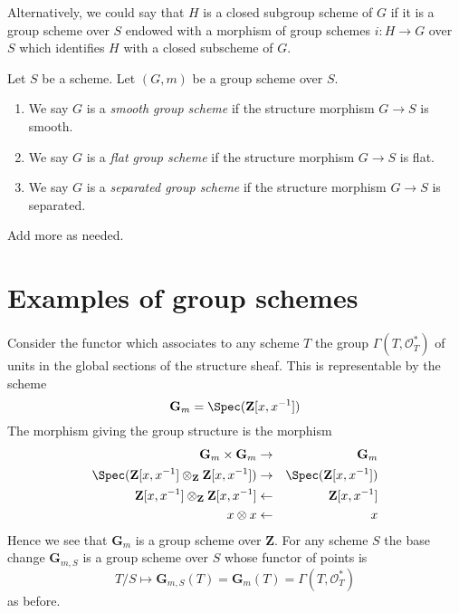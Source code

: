 \noindent
Alternatively, we could say that $H$ is a closed subgroup scheme of $G$
if it is a group scheme over $S$ endowed with a morphism of group schemes
$i : H \to G$ over $S$ which identifies $H$ with a closed subscheme of $G$.

\begin{definition}
\label{definition-smooth-group-scheme}
Let $S$ be a scheme. Let $(G, m)$ be a group scheme over $S$.
\begin{enumerate}
\item We say $G$ is a {\it smooth group scheme} if the structure
morphism $G \to S$ is smooth.
\item We say $G$ is a {\it flat group scheme} if the structure
morphism $G \to S$ is flat.
\item We say $G$ is a {\it separated group scheme} if the structure
morphism $G \to S$ is separated.
\end{enumerate}
Add more as needed.
\end{definition}






\section{Examples of group schemes}
\label{section-examples-group-schemes}

\begin{example}
\label{example-multiplicative-group}
Consider the functor which associates
to any scheme $T$ the group $\Gamma(T, \mathcal{O}_T^*)$
of units in the global sections of the structure sheaf.
This is representable by the scheme
$$
\mathbf{G}_m = \Spec(\mathbf{Z}[x, x^{-1}])
$$
The morphism giving the group structure is the morphism
\begin{eqnarray*}
\mathbf{G}_m \times \mathbf{G}_m & \to & \mathbf{G}_m \\
\Spec(\mathbf{Z}[x, x^{-1}] \otimes_{\mathbf{Z}} \mathbf{Z}[x, x^{-1}])
& \to &
\Spec(\mathbf{Z}[x, x^{-1}]) \\
\mathbf{Z}[x, x^{-1}] \otimes_{\mathbf{Z}} \mathbf{Z}[x, x^{-1}]
& \leftarrow &
\mathbf{Z}[x, x^{-1}] \\
x \otimes x & \leftarrow & x
\end{eqnarray*}
Hence we see that $\mathbf{G}_m$ is a group scheme over $\mathbf{Z}$.
For any scheme $S$ the base change $\mathbf{G}_{m, S}$ is a
group scheme over $S$ whose functor of points is
$$
T/S
\longmapsto
\mathbf{G}_{m, S}(T) = \mathbf{G}_m(T) = \Gamma(T, \mathcal{O}_T^*)
$$
as before.
\end{example}

